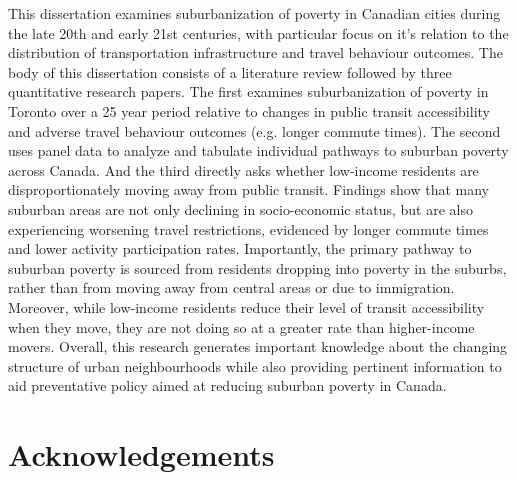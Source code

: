 \documentclass[11 pt, letterpaper]{report}
\begin{document}
This dissertation examines suburbanization of poverty in Canadian cities during the late 20th and early 21st centuries, with particular focus on it's relation to the distribution of transportation infrastructure and travel behaviour outcomes. The body of this dissertation consists of a literature review followed by three quantitative research papers. The first examines suburbanization of poverty in Toronto over a 25 year period relative to changes in public transit accessibility and adverse travel behaviour outcomes (e.g. longer commute times). The second uses panel data to analyze and tabulate individual pathways to suburban poverty across Canada. And the third directly asks whether low-income residents are disproportionately moving away from public transit. Findings show that many suburban areas are not only declining in socio-economic status, but are also experiencing worsening travel restrictions, evidenced by longer commute times and lower activity participation rates. Importantly, the primary pathway to suburban poverty is sourced from residents dropping into poverty in the suburbs, rather than from moving away from central areas or due to immigration. Moreover, while low-income residents reduce their level of transit accessibility when they move, they are not doing so at a greater rate than higher-income movers. Overall, this research generates important knowledge about the changing structure of urban neighbourhoods while also providing pertinent information to aid preventative policy aimed at reducing suburban poverty in Canada.





\vspace{12mm}



\newpage


\chapter*{\Large{Acknowledgements}}

\end{document}
